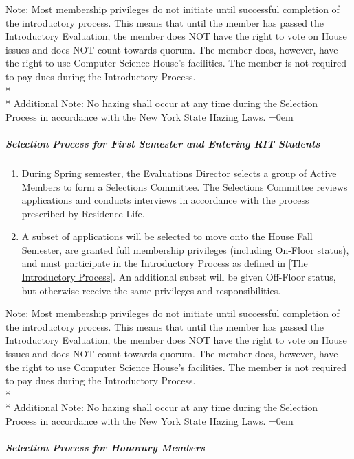 \documentclass{article}
\newcommand{\asubsubsubsection}[1]{\parindent=0em\subparagraph{#1} \label{#1}}
\begin{document}
Note: Most membership privileges do not initiate until successful completion of the introductory process.
This means that until the member has passed the Introductory Evaluation, the member does NOT have the right to vote on House issues and does NOT count towards quorum.
The member does, however, have the right to use Computer Science House's facilities.
The member is not required to pay dues during the Introductory Process.
\\* \\*
Additional Note: No hazing shall occur at any time during the Selection Process in accordance with the New York State Hazing Laws.
\asubsubsubsection{Selection Process for First Semester and Entering RIT Students}
\begin{enumerate}
	\item During Spring semester, the Evaluations Director selects a group of Active Members to form a Selections Committee.
		The Selections Committee reviews applications and conducts interviews in accordance with the process prescribed by Residence Life.
	\item A subset of applications will be selected to move onto the House Fall Semester, are granted full membership privileges (including On-Floor status), and must participate in the Introductory Process as defined in \ref{The Introductory Process}.
		An additional subset will be given Off-Floor status, but otherwise receive the same privileges and responsibilities.
\end{enumerate}
Note: Most membership privileges do not initiate until successful completion of the introductory process.
This means that until the member has passed the Introductory Evaluation, the member does NOT have the right to vote on House issues and does NOT count towards quorum.
The member does, however, have the right to use Computer Science House's facilities.
The member is not required to pay dues during the Introductory Process.
\\* \\*
Additional Note: No hazing shall occur at any time during the Selection Process in accordance with the New York State Hazing Laws.
\asubsubsubsection{Selection Process for Honorary Members}
\end{document}
